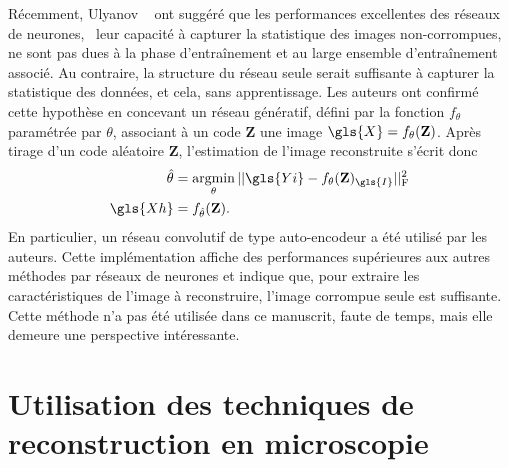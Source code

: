 Récemment, Ulyanov \etal~\cite{ulyanov2020deep} ont suggéré que les performances excellentes des réseaux de neurones, \ie\ leur capacité à capturer la statistique des images non-corrompues, ne sont pas dues à la phase d'entraînement et au large ensemble d'entraînement associé.
%
Au contraire, la structure du réseau seule serait suffisante à capturer la statistique des données, et cela, sans apprentissage. 
%
Les auteurs ont confirmé cette hypothèse en concevant un réseau génératif, défini par la fonction $f_\theta$ paramétrée par $\theta$, associant à un code $\mathbf{Z}$ une image $\gls{X}=f_\theta(\mathbf{Z})$. Après tirage d'un code aléatoire $\mathbf{Z}$, l'estimation de l'image reconstruite s'écrit donc
\begin{align}
    \hat{\theta} &= \argmin_\theta \frobnorm{\gls{Yi}-f_\theta(\mathbf{Z})_{\gls{I}}}\\
    \gls{Xh} &= f_{\hat{\theta}} (\mathbf{Z}).
\end{align}
En particulier, un réseau convolutif de type auto-encodeur a été utilisé par les auteurs. Cette implémentation affiche des performances supérieures aux autres méthodes par réseaux de neurones et indique que, pour extraire les caractéristiques de l'image à reconstruire, l'image corrompue seule est suffisante. Cette méthode n'a pas été utilisée dans ce manuscrit, faute de temps, mais elle demeure une perspective intéressante.




%
\section{Utilisation des techniques de reconstruction en microscopie}\label{sec-art-micro}

